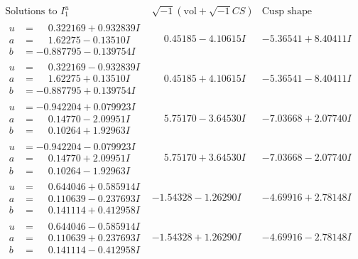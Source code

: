 \documentclass[1p]{elsarticle_modified}
\theoremstyle{definition}
\newcommand{\I}{\sqrt{-1}}
\begin{document}
$$\begin{array}{c|c|c}  
\text{Solutions to }I^u_{1}& \I (\text{vol} + \sqrt{-1}CS) & \text{Cusp shape}\\
 \hline 
\begin{aligned}
u &= \phantom{-}0.322169 + 0.932839 I \\
a &= \phantom{-}1.62275 - 0.13510 I \\
b &= -0.887795 - 0.139754 I\end{aligned}
 & \phantom{-}0.45185 - 4.10615 I & -5.36541 + 8.40411 I \\ \hline\begin{aligned}
u &= \phantom{-}0.322169 - 0.932839 I \\
a &= \phantom{-}1.62275 + 0.13510 I \\
b &= -0.887795 + 0.139754 I\end{aligned}
 & \phantom{-}0.45185 + 4.10615 I & -5.36541 - 8.40411 I \\ \hline\begin{aligned}
u &= -0.942204 + 0.079923 I \\
a &= \phantom{-}0.14770 - 2.09951 I \\
b &= \phantom{-}0.10264 + 1.92963 I\end{aligned}
 & \phantom{-}5.75170 - 3.64530 I & -7.03668 + 2.07740 I \\ \hline\begin{aligned}
u &= -0.942204 - 0.079923 I \\
a &= \phantom{-}0.14770 + 2.09951 I \\
b &= \phantom{-}0.10264 - 1.92963 I\end{aligned}
 & \phantom{-}5.75170 + 3.64530 I & -7.03668 - 2.07740 I \\ \hline\begin{aligned}
u &= \phantom{-}0.644046 + 0.585914 I \\
a &= \phantom{-}0.110639 - 0.237693 I \\
b &= \phantom{-}0.141114 + 0.412958 I\end{aligned}
 & -1.54328 - 1.26290 I & -4.69916 + 2.78148 I \\ \hline\begin{aligned}
u &= \phantom{-}0.644046 - 0.585914 I \\
a &= \phantom{-}0.110639 + 0.237693 I \\
b &= \phantom{-}0.141114 - 0.412958 I\end{aligned}
 & -1.54328 + 1.26290 I & -4.69916 - 2.78148 I \\ \hline\begin{aligned}

\end{aligned}
\end{array}$$
\end{document}
